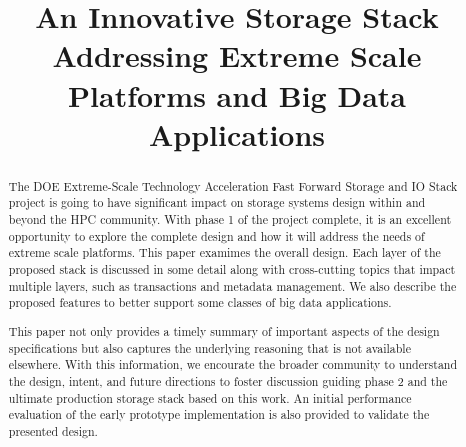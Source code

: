 \documentclass[conference]{IEEEtran}
\begin{document}

\title{An Innovative Storage Stack Addressing Extreme Scale Platforms and Big Data Applications}

\author{
}
\maketitle

\begin{abstract}
The DOE Extreme-Scale Technology Acceleration Fast Forward Storage and IO Stack
project is going to have significant impact on storage systems design within
and beyond the HPC community. With phase 1 of the project complete, it is an
excellent opportunity to explore the complete design and how it will address
the needs of extreme scale platforms.  This paper examimes the overall design.
Each layer of the proposed stack is discussed in some detail along with
cross-cutting topics that impact multiple layers, such as transactions and
metadata management. We also describe the proposed features to better support
some classes of big data applications.

This paper not only provides a timely summary of important aspects of the
design specifications but also captures the underlying reasoning that is not
available elsewhere. With this information, we encourate the broader community
to understand the design, intent, and future directions to foster discussion
guiding phase 2 and the ultimate production storage stack based on this work.
An initial performance evaluation of the early prototype implementation is also
provided to validate the presented design.

\end{abstract}

\end{document}

